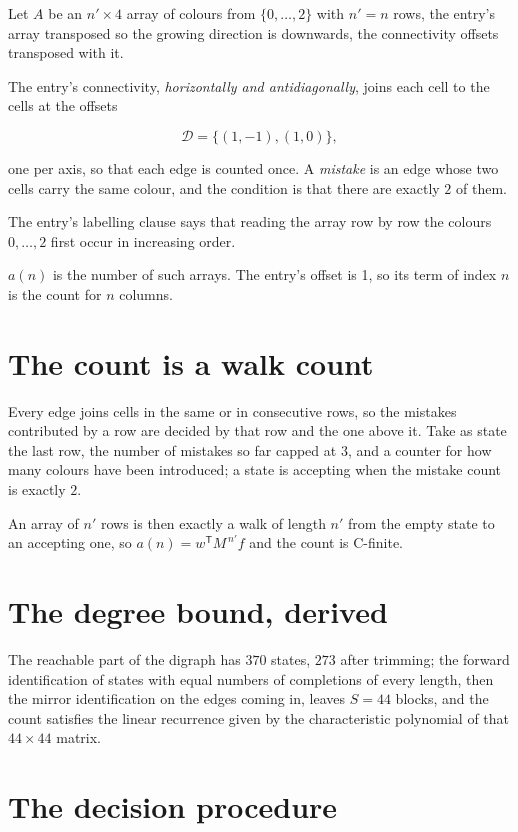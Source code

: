 \documentclass[11pt]{article}
\theoremstyle{definition}
\begin{document}
Let $A$ be an $n' \times 4$ array of colours from $\{0,\dots,2\}$ with $n' = n$ rows, the entry's array transposed so the growing direction is downwards, the connectivity offsets transposed with it.

The entry's connectivity, {\itshape horizontally and antidiagonally}, joins each cell to the cells at the offsets

\[\mathcal{D} = \{(1,-1), (1,0)\},\]

one per axis, so that each edge is counted once. A {\itshape mistake} is an edge whose two cells carry the same colour, and the condition is that there are exactly $2$ of them.

The entry's labelling clause says that reading the array row by row the colours $0,\dots,2$ first occur in increasing order.

$a(n)$ is the number of such arrays. The entry's offset is 1, so its term of index $n$ is the count for $n$ columns.

\section{The count is a walk count}

Every edge joins cells in the same or in consecutive rows, so the mistakes contributed by a row are decided by that row and the one above it. Take as state the last row, the number of mistakes so far capped at $3$, and a counter for how many colours have been introduced; a state is accepting when the mistake count is exactly $2$.

An array of $n'$ rows is then exactly a walk of length $n'$ from the empty state to an accepting one, so $a(n) = w^{\mathsf T}M^{\,n'}f$ and the count is C-finite.

\section{The degree bound, derived}

The reachable part of the digraph has $370$ states, $273$ after trimming; the forward identification of states with equal numbers of completions of every length, then the mirror identification on the edges coming in, leaves $S = 44$ blocks, and the count satisfies the linear recurrence given by the characteristic polynomial of that $44\times44$ matrix.

\section{The decision procedure}
\end{document}
